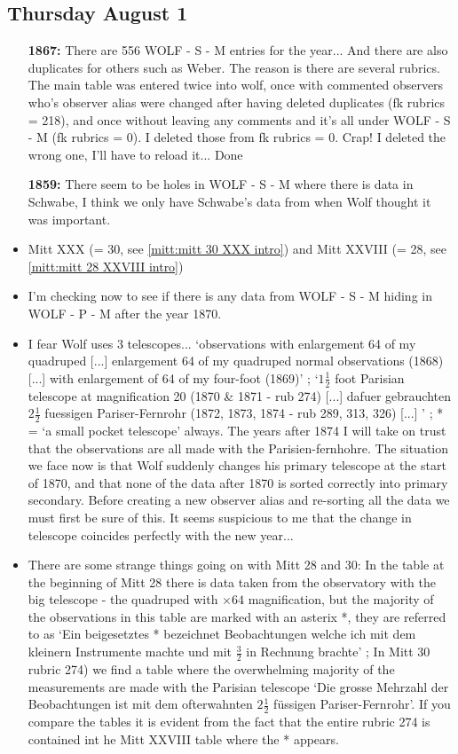 \documentclass[12pt]{article}
\begin{document}
\subsection{Thursday August 1}
\begin{itemize}
    \item[\textbf{1867:}] There are 556 WOLF - S - M entries for the year... And there are also duplicates for others such as Weber. The reason is there are several rubrics. The main table was entered twice into wolf, once with commented observers who's observer alias were changed after having deleted duplicates (fk rubrics = 218), and once without leaving any comments and it's all under WOLF - S - M (fk rubrics = 0). I deleted those from fk rubrics = 0. Crap! I deleted the wrong one, I'll have to reload it... Done
    \item[\textbf{1859:}] There seem to be holes in WOLF - S - M where there is data in Schwabe, I think we only have Schwabe's data from when Wolf thought it was important.
    \item Mitt XXX (= 30, see \ref{mitt:mitt 30 XXX intro}) and Mitt XXVIII (= 28, see \ref{mitt:mitt 28 XXVIII intro})
    \item I'm checking now to see if there is any data from WOLF - S - M hiding in WOLF - P - M after the year 1870.
    \item I fear Wolf uses 3 telescopes... `observations with enlargement 64 of my quadruped [...] enlargement 64 of my quadruped normal observations (1868) [...] with enlargement of 64 of my four-foot (1869)' ; `$1 \frac{1}{2}$ foot Parisian telescope at magnification 20 (1870 & 1871 - rub 274) [...] dafuer gebrauchten $2\frac{1}{2}$ fuessigen Pariser-Fernrohr (1872, 1873, 1874 - rub 289, 313, 326) [...] ' ; * = `a small pocket telescope' always. The years after 1874 I will take on trust that the observations are all made with the Parisien-fernhohre. The situation we face now is that Wolf suddenly changes his primary telescope at the start of 1870, and that none of the data after 1870 is sorted correctly into primary secondary. Before creating a new observer alias and re-sorting all the data we must first be sure of this. It seems suspicious to me that the change in telescope coincides perfectly with the new year...
    \item There are some strange things going on with Mitt 28 and 30: In the table at the beginning of Mitt 28 there is data taken from the observatory with the big telescope - the quadruped with $\times 64$ magnification, but the majority of the observations in this table are marked with an asterix *, they are referred to as `Ein beigesetztes * bezeichnet Beobachtungen welche ich mit dem kleinern Instrumente machte und mit $\frac{3}{2}$ in Rechnung brachte' ; In Mitt 30 rubric 274) we find a table where the overwhelming majority of the measurements are made with the Parisian telescope `Die grosse Mehrzahl der Beobachtungen ist mit dem ofterwahnten $2\frac{1}{2}$ füssigen Pariser-Fernrohr'. If you compare the tables it is evident from the fact that the entire rubric 274 is contained int he Mitt XXVIII table where the * appears. 

\end{itemize}
\end{document}
